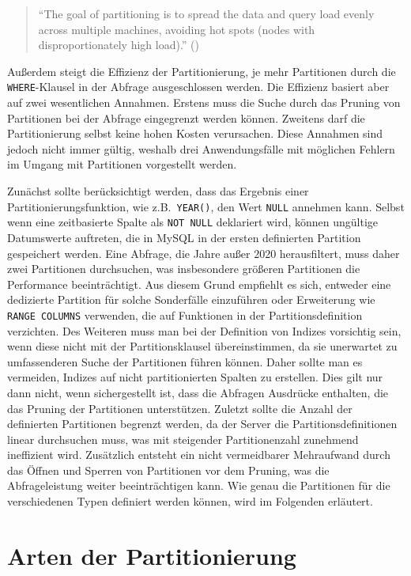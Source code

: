 \begin{quote}
	\enquote{The goal of partitioning is to spread the data and query load evenly across multiple machines, avoiding hot spots (nodes with disproportionately high load).} (\cite[S. 217]{kleppmann2017designing})
\end{quote}

Außerdem steigt die Effizienz der Partitionierung, je mehr Partitionen durch die \texttt{WHERE}-Klausel in der Abfrage ausgeschlossen werden.
Die Effizienz basiert aber auf zwei wesentlichen Annahmen.
Erstens muss die Suche durch das Pruning von Partitionen bei der Abfrage eingegrenzt werden können.
Zweitens darf die Partitionierung selbst keine hohen Kosten verursachen.
Diese Annahmen sind jedoch nicht immer gültig, weshalb drei Anwendungsfälle mit möglichen Fehlern im Umgang mit Partitionen vorgestellt werden.

Zunächst sollte berücksichtigt werden, dass das Ergebnis einer Partitionierungsfunktion, wie z.B.\ \texttt{YEAR()}, den Wert \texttt{NULL} annehmen kann.
Selbst wenn eine zeitbasierte Spalte als \texttt{NOT NULL} deklariert wird, können ungültige Datumswerte auftreten, die in MySQL in der ersten definierten Partition gespeichert werden.
Eine Abfrage, die Jahre außer 2020 herausfiltert, muss daher zwei Partitionen durchsuchen, was insbesondere größeren Partitionen die Performance beeinträchtigt.
Aus diesem Grund empfiehlt es sich, entweder eine dedizierte Partition für solche Sonderfälle einzuführen oder Erweiterung wie \texttt{RANGE COLUMNS} verwenden, die auf Funktionen in der Partitionsdefinition verzichten.
Des Weiteren muss man bei der Definition von Indizes vorsichtig sein, wenn diese nicht mit der Partitionsklausel übereinstimmen, da sie unerwartet zu umfassenderen Suche der Partitionen führen können.
Daher sollte man es vermeiden, Indizes auf nicht partitionierten Spalten zu erstellen.
Dies gilt nur dann nicht, wenn sichergestellt ist, dass die Abfragen Ausdrücke enthalten, die das Pruning der Partitionen unterstützen.
Zuletzt sollte die Anzahl der definierten Partitionen begrenzt werden, da der Server die Partitionsdefinitionen linear durchsuchen muss, was mit steigender Partitionenzahl zunehmend ineffizient wird.
Zusätzlich entsteht ein nicht vermeidbarer Mehraufwand durch das Öffnen und Sperren von Partitionen vor dem Pruning, was die Abfrageleistung weiter beeinträchtigen kann.
Wie genau die Partitionen für die verschiedenen Typen definiert werden können, wird im Folgenden erläutert.

\section{Arten der Partitionierung}\label{sec:arten-der-partitionierung}

